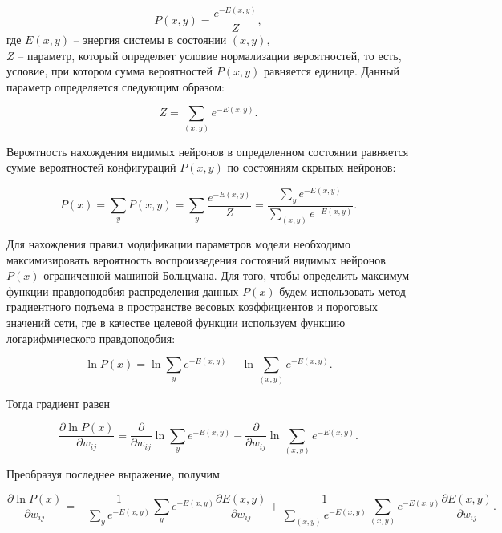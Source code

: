 \begin{equation*}
	P(x, y)=\frac{e^{-E(x,y)}}{Z},
\end{equation*}
где $E(x,y)$ -- энергия системы в состоянии $(x,y)$,\\
$Z$ -- параметр, который определяет условие нормализации вероятностей, то есть, условие, при котором сумма вероятностей $P(x, y)$ равняется единице. Данный параметр определяется следующим образом:
	
\begin{equation*}
	Z=\sum_{(x,y)} e^{-E(x,y)}.
\end{equation*}
	
Вероятность нахождения видимых нейронов в определенном состоянии равняется сумме вероятностей  конфигураций $P(x,y)$ по состояниям скрытых нейронов:
	
\begin{equation*}
	P(x)=\sum_y P(x,y)=\sum_y \frac{e^{-E(x,y)}}{Z}=\frac{\sum_y e^{-E(x,y)}}{\sum_{(x,y)} e^{-E(x,y)}}.
\end{equation*}
	
Для нахождения правил модификации параметров модели необходимо максимизировать вероятность воспроизведения состояний видимых нейронов $P(x)$ ограниченной машиной Больцмана. Для того, чтобы определить максимум функции правдоподобия распределения данных $P(x)$ будем использовать метод градиентного подъема в пространстве весовых коэффициентов и пороговых значений сети, где в качестве целевой функции используем функцию логарифмического правдоподобия:
	
\begin{equation*}
	\ln P(x)=\ln \sum_y e^{-E(x,y)}-\ln \sum_{(x,y)} e^{-E(x,y)}.
\end{equation*}
	
Тогда градиент равен
	
\begin{equation*}
	\frac{\partial \ln P(x)}{\partial w_{ij}}=\frac{\partial}{\partial w_{ij}}\ln \sum_y e^{-E(x,y)}-\frac{\partial}{\partial w_{ij}}\ln\sum_{(x,y)} e^{-E(x,y)}.
\end{equation*}
	
Преобразуя последнее выражение, получим
	
\begin{equation*}
	\frac{\partial \ln P(x)}{\partial w_{ij}}=-\frac{1}{\sum_y e^{-E(x,y)}}\sum_y e^{-E(x,y)}\frac{\partial E(x,y)}{\partial w_{ij}}+\frac{1}{\sum_{(x,y)} e^{-E(x,y)}}\sum_{(x,y)} e^{-E(x,y)}\frac{\partial E(x,y)}{\partial w_{ij}}.
\end{equation*}
	
